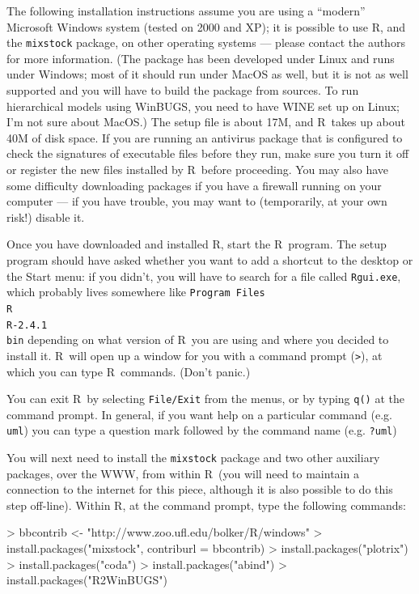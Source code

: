 \documentclass[11pt]{article}
\newcommand{\R}{{\sf R}}
\newcommand{\Rver}{2.4.1}
\begin{document}
The following installation instructions assume
you are using a ``modern'' Microsoft Windows system
(tested on 2000 and XP); it is possible to use
\R, and the {\tt mixstock} package, on other
operating systems --- please contact the
authors for more information. 
(The package has been developed under Linux and runs under
Windows; most of it should run under MacOS as well, but
it is not as well supported and you will have to build
the package from sources.   To run hierarchical models using
WinBUGS, you need to have WINE set up on Linux; I'm not
sure about MacOS.)
The setup file is about 17M, and 
\R\ takes up about 40M of disk space.
If you are running an antivirus package that is configured to check
the signatures of executable files before they run, make sure you turn
it off or register the new files installed by \R\ before proceeding.
You may also have some difficulty downloading packages if you have
a firewall running on your computer --- if you have trouble,
you may want to (temporarily, at your own risk!) disable it.

Once you have downloaded and installed \R,
start the \R\ program.  The setup program
should have asked whether you want to add a shortcut
to the desktop or the Start menu: if
you didn't, you will have to search for a file
called {\tt Rgui.exe}, which probably lives somewhere
like {\tt Program Files\\R\\R-\Rver\\bin} depending
on what version of \R\ you are using and where
you decided to install it.
\R\ will open up a window for you with a command
prompt ({\verb+>+}), at which you can type
\R\ commands.  (Don't panic.)

You can exit \R\ by selecting {\tt File/Exit} from
the menus, or by typing {\tt q()} at the command prompt.
In general, if you want help on a particular command
(e.g. {\tt uml}) you can type a question mark
followed by the command name (e.g. {\tt ?uml})

You will next need to install the {\tt mixstock}
package and two other auxiliary packages, over
the WWW, from within \R\ (you will need to
maintain a connection to the internet for this
piece, although it is also possible to do
this step off-line).
Within \R, at the command prompt, type the
following commands:
\begin{Schunk}
\begin{Sinput}
> bbcontrib <- "http://www.zoo.ufl.edu/bolker/R/windows"
> install.packages("mixstock", contriburl = bbcontrib)
> install.packages("plotrix")
> install.packages("coda")
> install.packages("abind")
> install.packages("R2WinBUGS")
\end{Sinput}
\end{Schunk}
\end{document}
